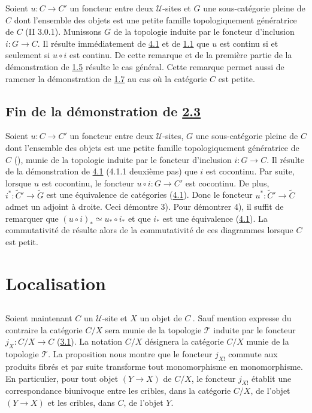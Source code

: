 \documentclass[10pt]{../fichiers-configuration-latex/smfart}
\begin{document}
Soient $u:C\rightarrow C'$ un foncteur entre deux $𝒰$-sites
et $G$ une sous-catégorie pleine de $C$ dont l'ensemble des
objets est une petite famille topologiquement génératrice de
$C$ (II 3.0.1). Munissons $G$ de la topologie induite par le
foncteur d'inclusion $i:G\rightarrow C$. Il résulte
immédiatement de \hyperref[III.theo4.1]{4.1} et de \hyperref[III.def1.1]{1.1} que
$u$ est continu si et seulement si $u\circ i$ est continu. De cette
remarque et de la première partie de la démonstration de
\hyperref[III.prop1.5]{1.5} résulte le cas général. Cette remarque
permet aussi de ramener la démonstration de \hyperref[III.prop1.7]{1.7} au
cas où la catégorie $C$ est petite.

\subsection{Fin de la démonstration de \hyperref[III.prop2.3]{2.3}}

Soient $u:C\rightarrow C'$ un foncteur entre deux $𝒰$-sites,
$G$ une sous-catégorie pleine de $C$ dont l'ensemble des objets
est une petite famille topologiquement génératrice de $C$
(), munie de la topologie induite par le foncteur
d'inclusion $i:G\rightarrow C$. Il résulte de la
démonstration de \hyperref[III.theo4.1]{4.1} (4.1.1 deuxième pas) que
$i$ est cocontinu. Par suite, lorsque $u$ est cocontinu, le foncteur
$u\circ i:G\rightarrow C'$ est cocontinu. De plus,
$i^{\ast}:\widetilde{C}'\rightarrow \widetilde{G}$ est une
équivalence de catégories (\hyperref[III.theo4.1]{4.1}). Donc le
foncteur $u^{\ast}:\widetilde{C}'\rightarrow \widetilde{C}$ admet un
adjoint à droite. Ceci démontre 3). Pour démontrer 4), il
suffit de remarquer que $(u\circ i)_{\ast}\simeq u_{\ast}\circ
i_{\ast}$ et que $i_{\ast}$ est une équivalence
(\hyperref[III.theo4.1]{4.1}). La commutativité de 
résulte alors de la commutativité de ces diagrammes lorsque
$C$ est petit.


\section{Localisation}\pageoriginale

\subsection{}
Soient maintenant $C$ un $𝒰$-site et $X$ un objet de
$C^{\widehat{\phantom{,}}}$. Sauf mention expresse du contraire la
catégorie $C/X$ sera munie de la topologie $𝒯$ induite par le
foncteur $j_X:C/X\rightarrow C$ (\hyperref[III.subsec3.1]{3.1}). La notation
$C/X$ désignera la catégorie $C/X$ munie de la topologie $𝒯$. La
proposition  nous montre que le foncteur $j_{X!}$
commute aux produits fibrés et par suite transforme tout
monomorphisme en monomorphisme. En particulier, pour tout objet
$(Y\rightarrow X)$ de $C/X$, le foncteur $j_{X!}$ établit une
correspondance biunivoque entre les cribles, dans la catégorie
$C/X$, de l'objet $(Y\rightarrow X)$ et les cribles, dans $C$, de
l'objet $Y$.
\end{document}
